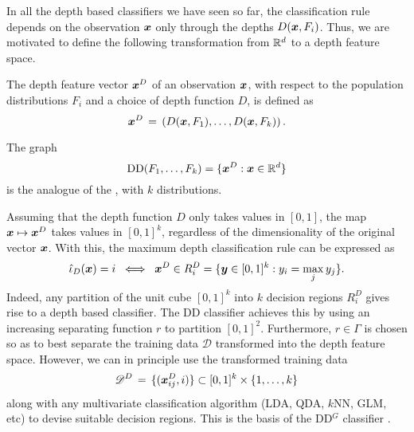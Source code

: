 In all the depth based classifiers we have seen so far, the classification
rule depends on the observation $\bm{x}$ only through the depths $D(\bm{x}, F_i)$.
Thus, we are motivated to define the following transformation from $\mathbb{R}^d$ to a
depth feature space.

\begin{definition}
    The depth feature vector $\bm{x}^D$ of an observation $\bm{x}$, with respect to
    the population distributions $F_i$ and a choice of depth function $D$, is
    defined as
    \begin{equation}
        \bm{x}^D \,=\, \left(D(\bm{x}, F_1), \dots, D(\bm{x}, F_k)\right).
    \end{equation}
\end{definition}
\begin{remark}
    The graph
    \begin{equation}
        \operatorname{DD}(F_1, \dots, F_k) = \{\bm{x}^D : \bm{x} \in \mathbb{R}^d\}
    \end{equation}
    is the analogue of the , with $k$ distributions.
\end{remark}

Assuming that the depth function $D$ only takes values in $[0, 1]$, the map
$\bm{x} \mapsto \bm{x}^D$ takes values in $[0, 1]^k$, regardless of the
dimensionality of the original vector $\bm{x}$.
With this, the maximum depth classification rule can be expressed as
\begin{equation}
    \hat{\iota}_D(\bm{x}) = i \;\iff\; \bm{x}^D \in R_i^D = \{\bm{y} \in [0, 1]^k : y_i = \max_j y_j\}.
\end{equation}
Indeed, any partition of the unit cube $[0, 1]^k$ into $k$ decision regions
$R^D_i$ gives rise to a depth based classifier.
The DD classifier achieves this by using an increasing separating function
$r$ to partition $[0, 1]^2$.
Furthermore, $r \in \Gamma$ is chosen so as to best separate the training data
$\mathscr{D}$ transformed into the depth feature space.
However, we can in principle use the transformed training data
\begin{equation}
    \mathscr{D}^D \,=\, \{(\bm{x}^D_{ij}, i)\} \subset [0, 1]^k \times \{1, \dots, k\}
\end{equation}
along with any multivariate classification algorithm (LDA, QDA, $k$NN, GLM,
etc) to devise suitable decision regions.
This is the basis of the DD$^G$ classifier
\parencite{albertos-bande-fuente-2017}.


